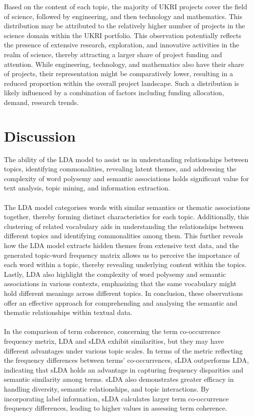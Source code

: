 \documentclass[12pt,twoside]{article}
\begin{document}
Based on the content of each topic, the majority of UKRI projects cover the field of science, followed by engineering, and then technology and mathematics. This distribution may be attributed to the relatively higher number of projects in the science domain within the UKRI portfolio. This observation potentially reflects the presence of extensive research, exploration, and innovative activities in the realm of science, thereby attracting a larger share of project funding and attention. While engineering, technology, and mathematics also have their share of projects, their representation might be comparatively lower, resulting in a reduced proportion within the overall project landscape. Such a distribution is likely influenced by a combination of factors including funding allocation, demand, research trends.

\newpage
\section{Discussion}

The ability of the LDA model to assist us in understanding relationships between topics, identifying commonalities, revealing latent themes, and addressing the complexity of word polysemy and semantic associations holds significant value for text analysis, topic mining, and information extraction.\\\\

The LDA model categorises words with similar semantics or thematic associations together, thereby forming distinct characteristics for each topic. Additionally, this clustering of related vocabulary aids in understanding the relationships between different topics and identifying commonalities among them. This further reveals how the LDA model extracts hidden themes from extensive text data, and the generated topic-word frequency matrix allows us to perceive the importance of each word within a topic, thereby revealing underlying content within the topics. Lastly, LDA also highlight the complexity of word polysemy and semantic associations in various contexts, emphasizing that the same vocabulary might hold different meanings across different topics. In conclusion, these observations offer an effective approach for comprehending and analysing the semantic and thematic relationships within textual data.\\\\

In the comparison of term coherence, concerning the term co-occurrence frequency metrix, LDA and sLDA exhibit similarities, but they may have different advantages under various topic scales. In terms of the metric reflecting the frequency differences between terms' co-occurrences, sLDA outperforms LDA, indicating that sLDA holds an advantage in capturing frequency disparities and semantic similarity among terms. sLDA also demonstrates greater efficacy in handling diversity, semantic relationships, and topic interactions. By incorporating label information, sLDA calculates larger term co-occurrence frequency differences, leading to higher values in assessing term coherence.\\\\
\end{document}
